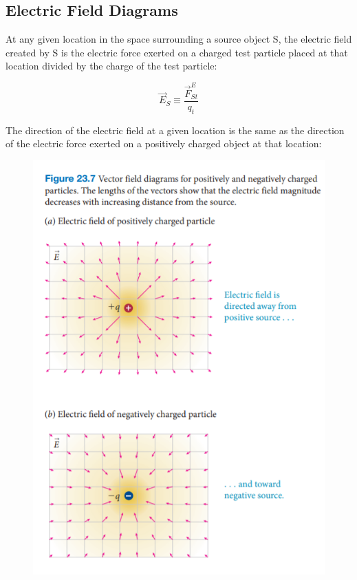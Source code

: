     \subsection{Electric Field Diagrams}    %

        At any given location in the space surrounding a source object S, the electric field created by S is the electric force exerted on a charged test particle placed at that location divided by the charge of the test
        particle:

        \[
            \vec{E}_S  \equiv \frac{\vec{F}^E_{St}}{q_t}
        \]

        The direction of the electric field at a given location is the same as the direction of the electric force exerted on a positively charged object at that location:

        \begin{figure}[hbt!]
            \centering
            \includegraphics[scale=0.75]{Resources/23.2_Fields}
        \end{figure}

